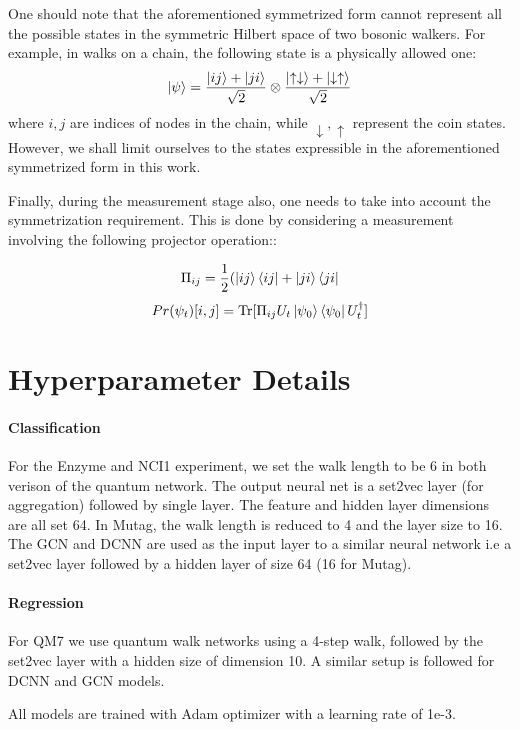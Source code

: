 One should note that the aforementioned symmetrized form cannot represent all the possible states in the symmetric Hilbert space of two bosonic walkers. For example, in walks on a chain, the following state is a physically allowed one:
$$
\ket{\psi} = \dfrac{\ket{ij} + \ket{ji}}{\sqrt{2}} \otimes \dfrac{\ket{\uparrow \downarrow} + \ket{ \downarrow \uparrow}}{\sqrt{2}}
$$
where $i,j$ are indices of nodes in the chain, while $\downarrow,\uparrow$ represent the coin states. However, we shall limit ourselves to the states expressible in the aforementioned symmetrized form in this work.

Finally, during the measurement stage also, one needs to take into account the symmetrization requirement. This is done by considering a measurement involving the following projector operation::

$$
\Pi_{ij} = \frac{1}{2}(\ket{ij}\bra{ij} + \ket{ji}\bra{ji} 
$$
$$
Pr(\psi_t)[i,j] = \text{Tr}[\Pi_{ij} U_t\ket{\psi_0}\bra{\psi_0}U_t^\dagger]
$$

\section{Hyperparameter Details}
\label{apx:hyper}

\paragraph{Classification}
For the Enzyme and NCI1 experiment, we set the walk length to be 6 in both verison of the quantum network. The output neural net is a set2vec layer (for aggregation) followed by single layer. The feature and hidden layer dimensions are all set 64. In Mutag, the walk length is reduced to 4 and the layer size to 16. The GCN and DCNN are used as the input layer to a similar neural network i.e a set2vec layer followed by a hidden layer of size 64 (16 for Mutag).


\paragraph{Regression}
For QM7 we use quantum walk networks using a 4-step walk, followed by the set2vec layer with a hidden size of dimension 10. A similar setup is followed for DCNN and GCN models.

All models are trained with Adam optimizer with a learning rate of 1e-3.
